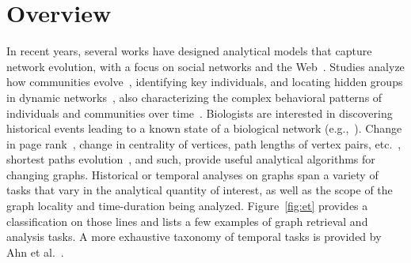\documentclass{svjour3}
\begin{document}
\section{Overview}
In recent years, several works have designed analytical models that capture network evolution, with a focus on
social networks and the Web~\cite{LeskovecKF07,Kumar:2006:SEO:1150402.1150476}. Studies analyze how communities evolve~\cite{tang2008community}, identifying key individuals,
and locating hidden groups in dynamic networks~\cite{tantipathananandh2007framework}, also characterizing the complex behavioral patterns 
of individuals and communities over time~\cite{Asur2009}.
Biologists are interested in discovering historical events leading to a 
known state of a biological network (e.g.,~\cite{10.1371/journal.pcbi.1001119}).
Change in page rank~\cite{bahmani2010fast}, change in centrality of vertices, path lengths of vertex pairs,
etc.~\cite{pan2011path}, shortest paths evolution~\cite{RenEvolvGraph11}, and such, provide useful analytical algorithms for changing graphs.
Historical or temporal analyses on graphs span a variety of tasks that vary in the analytical quantity of interest, as well as the scope of the graph locality and time-duration being analyzed. 
Figure~\ref{fig:et} provides a classification on those lines and lists a few examples of graph retrieval and analysis tasks.
A more exhaustive taxonomy of temporal tasks is provided by Ahn et al.~\cite{ahn2014task}.
\end{document}
